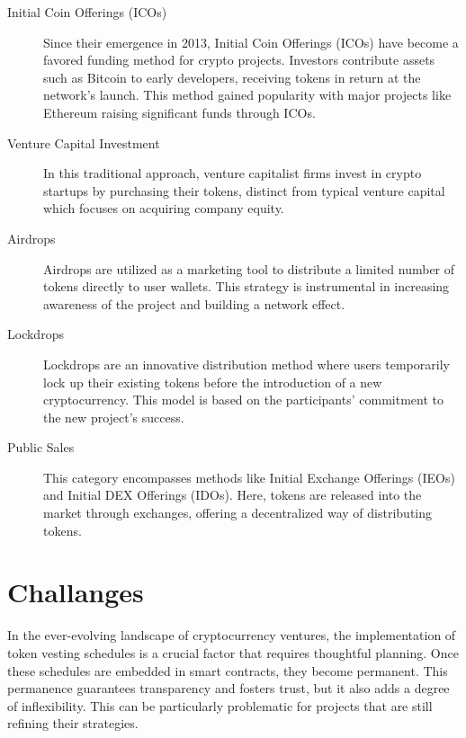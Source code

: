 \documentclass[12pt,oneside]{article}
\begin{document}
\begin{description}
  \item[Initial Coin Offerings (ICOs)]
  Since their emergence in 2013, Initial Coin Offerings (ICOs) have become a favored funding 
  method for crypto projects. Investors contribute assets such as Bitcoin to early developers, 
  receiving tokens in return at the network's launch. This method gained popularity with major projects 
  like Ethereum raising significant funds through ICOs.

  \item[Venture Capital Investment]
  In this traditional approach, venture capitalist firms invest in crypto startups by 
  purchasing their tokens, distinct from typical venture capital which focuses on acquiring company equity.

  \item[Airdrops]
  Airdrops are utilized as a marketing tool to distribute a limited number of 
  tokens directly to user wallets. This strategy is instrumental in increasing awareness 
  of the project and building a network effect.

  \item[Lockdrops]
  Lockdrops are an innovative distribution method where users temporarily lock up their existing 
  tokens before the introduction of a new cryptocurrency. This model is based on the participants' 
  commitment to the new project's success.

  \item[Public Sales]
  This category encompasses methods like Initial Exchange Offerings (IEOs) and Initial DEX Offerings
  (IDOs). Here, tokens are released into the market through exchanges, offering a decentralized way 
  of distributing tokens.
\end{description}


\section{Challanges}

In the ever-evolving landscape of cryptocurrency ventures, the implementation of token vesting schedules is 
a crucial factor that requires thoughtful planning. Once these schedules are embedded in smart contracts, 
they become permanent. This permanence guarantees transparency and fosters trust, but it also adds a degree 
of inflexibility. This can be particularly problematic for projects that are still refining their strategies.
\end{document}
